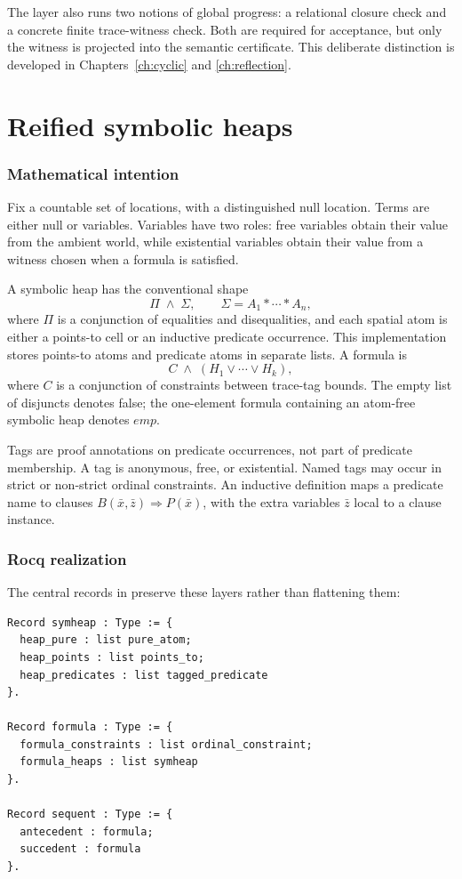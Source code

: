 \documentclass[11pt,oneside]{book}
\DeclareRobustCommand{\file}[1]{\texttt{\detokenize{#1}}}
\newcommand{\slstar}{\mathbin{*}}
\newcommand{\mathintent}{\subsection*{Mathematical intention}}
\newcommand{\rocqreal}{\subsection*{Rocq realization}}
\begin{document}
The \file{Cyclic} layer also runs two notions of global progress: a relational
closure check and a concrete finite trace-witness check.  Both are required for
acceptance, but only the witness is projected into the semantic certificate.
This deliberate distinction is developed in Chapters~\ref{ch:cyclic} and
\ref{ch:reflection}.

\chapter{Reified symbolic heaps}
\label{ch:syntax}

\mathintent

Fix a countable set of locations, with a distinguished null location.  Terms
are either null or variables.  Variables have two roles: free variables obtain
their value from the ambient world, while existential variables obtain their
value from a witness chosen when a formula is satisfied.

A symbolic heap has the conventional shape
\[
  \Pi \;\land\; \Sigma,
  \qquad
  \Sigma = A_1 \slstar \cdots \slstar A_n,
\]
where \(\Pi\) is a conjunction of equalities and disequalities, and each spatial
atom is either a points-to cell or an inductive predicate occurrence.  This
implementation stores points-to atoms and predicate atoms in separate lists.
A formula is
\[
  C\;\land\;(H_1\lor\cdots\lor H_k),
\]
where \(C\) is a conjunction of constraints between trace-tag bounds.  The
empty list of disjuncts denotes false; the one-element formula containing an
atom-free symbolic heap denotes \(emp\).

Tags are proof annotations on predicate occurrences, not part of predicate
membership.  A tag is anonymous, free, or existential.  Named tags may occur
in strict or non-strict ordinal constraints.  An inductive definition maps a
predicate name to clauses \(B(\bar{x},\bar{z}) \Rightarrow P(\bar{x})\), with
the extra variables \(\bar z\) local to a clause instance.

\rocqreal

The central records in \file{SP/Syntax.v} preserve these layers rather than
flattening them:

\begin{lstlisting}[caption={The reified symbolic-heap core.}]
Record symheap : Type := {
  heap_pure : list pure_atom;
  heap_points : list points_to;
  heap_predicates : list tagged_predicate
}.

Record formula : Type := {
  formula_constraints : list ordinal_constraint;
  formula_heaps : list symheap
}.

Record sequent : Type := {
  antecedent : formula;
  succedent : formula
}.
\end{lstlisting}
\end{document}
